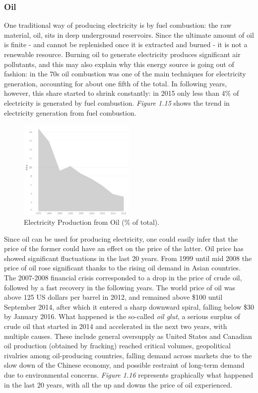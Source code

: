 \documentclass{book}
\begin{document}
\subsubsection*{Oil}

One traditional way of producing electricity is by fuel combustion: the raw material, oil, sits in deep underground reservoirs. Since the ultimate amount of oil is finite - and cannot be replenished once it is extracted and burned - it is not a renewable resource. Burning oil to generate electricity produces significant air pollutants, and this may also explain why this energy source is going out of fashion: in the 70s oil combustion was one of the main techniques for electricity generation, accounting for about one fifth of the total. In following years, however, this share started to shrink constantly: in 2015 only less than 4\% of electricity is generated by fuel combustion. \textit{Figure 1.15} shows the trend in electricity generation from fuel combustion.

\bigskip
\begin{figure}[H]
\begin{center}
\captionsetup{justification=centering}
\includegraphics[width=0.5\textwidth]{Images/oil.png}
\caption{Electricity Production from Oil (\% of total). }
\end{center}
\end{figure}
\bigskip
 
Since oil can be used for producing electricity, one could easily infer that the price of the former could have an effect on the price of the latter. Oil price has showed significant fluctuations in the last 20 years. From 1999 until mid 2008 the price of oil rose significant thanks to the rising oil demand in Asian countries. The 2007-2008 financial crisis corresponded to a drop in the price of crude oil, followed by a fast recovery in the following years. The world price of oil was above 125 US dollars per barrel in 2012, and remained above \$100 until September 2014, after which it entered a sharp downward spiral, falling below \$30 by January 2016. What happened is the so-called \textit{oil glut}, a serious surplus of crude oil that started in 2014 and accelerated in the next two years, with multiple causes. These include general oversupply as United States and Canadian oil production (obtained by fracking) reached critical volumes, geopolitical rivalries among oil-producing countries, falling demand across markets due to the slow down of the Chinese economy, and possible restraint of long-term demand due to environmental concerns. \textit{Figure 1.16} represents graphically what happened in the last 20 years, with all the up and downs the price of oil experienced.
\end{document}

